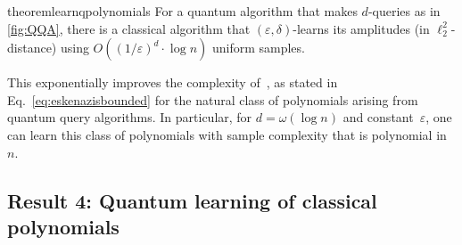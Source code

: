 \documentclass[11pt]{article}
\newcommand{\eps}{\varepsilon}
\theoremstyle{plain}
\theoremstyle{plain}
\theoremstyle{definition}
\theoremstyle{remark}
\theoremstyle{named}
\begin{document}
\begin{restatable}{theorem}{learnqpolynomials}\label{theo:learnqpolynomials}
    For a quantum algorithm that makes $d$-queries as in \cref{fig:QQA},  there is a classical algorithm that $(\eps,\delta)$-learns its amplitudes  (in $\ell_2^2$-distance) using  
    $
    O\left((1/\varepsilon)^d\cdot  \log n\right)
    $
    uniform samples.
\end{restatable}

This exponentially improves the complexity of~\cite{eskenazis2022learning}, as stated in Eq.~\eqref{eq:eskenazisbounded} for the natural class of  polynomials arising from quantum query algorithms. In particular, for $d=\omega(\log n)$ and constant~$\eps$, one can learn this class of polynomials with sample complexity that is polynomial in $n$.  


\subsection{Result 4: Quantum learning of classical polynomials}
\end{document}
